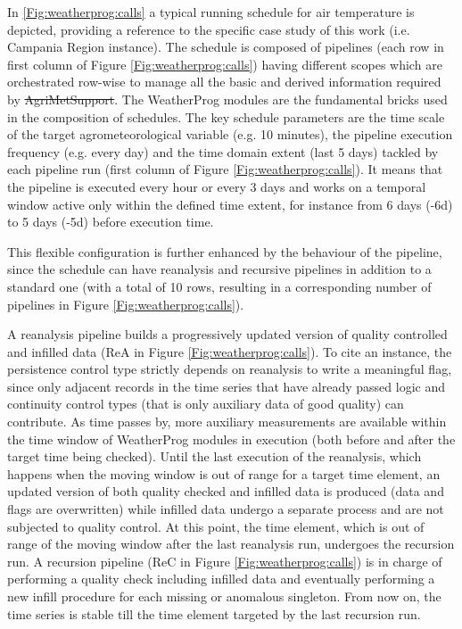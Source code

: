 \documentclass[authoryear,preprint,review,12pt]{elsarticle}
\makeatletter
\providecommand{\DIFadd}[1]{{\protect\color{blue}\uwave{#1}}} %
\providecommand{\DIFdel}[1]{{\protect\color{red}\sout{#1}}} %
\providecommand{\DIFaddbegin}{} %
\providecommand{\DIFaddend}{} %
\providecommand{\DIFdelbegin}{} %
\providecommand{\DIFdelend}{} %
\let\sout@orig\sout %
\renewcommand{\sout}[1]{\ifmmode\text{\sout@orig{\ensuremath{#1}}}\else\sout@orig{#1}\fi} %
\makeatother
\begin{document}
\DIFaddend In \cref{Fig:weatherprog:calls} a typical running schedule for air temperature is depicted, providing a reference to the specific case study of this work (i.e. Campania Region instance).
The schedule is composed of pipelines (each row in first column of Figure \ref{Fig:weatherprog:calls}) having different scopes which are orchestrated row-wise to manage all the basic and derived information required by \DIFdelbegin \DIFdel{AgriMetSupport}\DIFdelend \DIFaddbegin \DIFadd{Agri\-Met\-Support}\DIFaddend .
The WeatherProg modules are the fundamental bricks used in the composition of schedules.
The key schedule parameters are the time scale of the target agrometeorological variable (e.g. 10 minutes), the pipeline execution frequency (e.g. every day) and the time domain extent (last 5 days) tackled by each pipeline run (first column of Figure \ref{Fig:weatherprog:calls}).
It means that the pipeline is executed every hour or every 3 days and works on a temporal window active only within the defined time extent, for instance from 6 days (-6d) to 5 days (-5d) before execution time.

This flexible configuration is further enhanced by the behaviour of the pipeline, since the schedule can have reanalysis and recursive pipelines in addition to a standard one (with a total of 10 rows, resulting in a corresponding number of pipelines in Figure \ref{Fig:weatherprog:calls}).

A reanalysis pipeline builds a progressively updated version of quality controlled and infilled data (ReA in Figure \ref{Fig:weatherprog:calls}).
To cite an instance, the persistence control type strictly depends on reanalysis to write a meaningful flag, since only adjacent records in the time series that have already passed logic and continuity control types (that is only auxiliary data of good quality) can contribute. %
As time passes by, more auxiliary measurements are available within the time window of WeatherProg modules in execution (both before and after the target time being checked). 
Until the last execution of the reanalysis, which happens when the moving window is out of range for a target time element, an updated version of both quality checked and infilled data is produced (data and flags are overwritten) while infilled data undergo a separate process and are not subjected to quality control.
At this point, the time element, which is out of range of the moving window after the last reanalysis run, undergoes the recursion run.
A recursion pipeline (ReC in Figure \ref{Fig:weatherprog:calls}) is in charge of performing a quality check including infilled data and eventually performing a new infill procedure for each missing or anomalous singleton.
From now on, the time series is stable till the time element targeted by the last recursion run.
\end{document}
